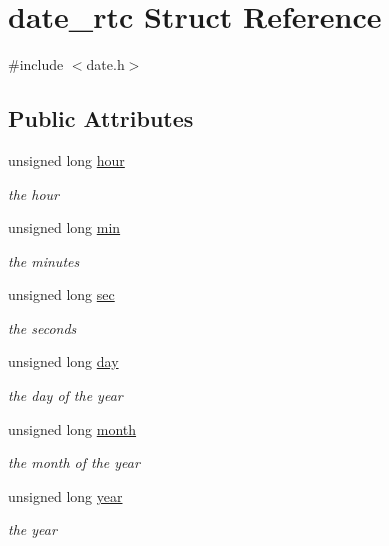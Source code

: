 \hypertarget{structdate__rtc}{}\section{date\+\_\+rtc Struct Reference}
\label{structdate__rtc}


{\ttfamily \#include $<$date.\+h$>$}

\subsection*{Public Attributes}
\begin{DoxyCompactItemize}
\item 
unsigned long \hyperlink{structdate__rtc_a4a231dccac478c1e2eb419ee34535e0e}{hour}
\begin{DoxyCompactList}\small\item\em the hour \end{DoxyCompactList}\item 
unsigned long \hyperlink{structdate__rtc_a6ea5d53162f2139e1e2a8d59bd3083b9}{min}
\begin{DoxyCompactList}\small\item\em the minutes \end{DoxyCompactList}\item 
unsigned long \hyperlink{structdate__rtc_a4d0f917003e201fbfe662d4c91907645}{sec}
\begin{DoxyCompactList}\small\item\em the seconds \end{DoxyCompactList}\item 
unsigned long \hyperlink{structdate__rtc_aafb65ff718f63c0e56aff1168ab3c154}{day}
\begin{DoxyCompactList}\small\item\em the day of the year \end{DoxyCompactList}\item 
unsigned long \hyperlink{structdate__rtc_a12309edd1455518380682d3241cd4b75}{month}
\begin{DoxyCompactList}\small\item\em the month of the year \end{DoxyCompactList}\item 
unsigned long \hyperlink{structdate__rtc_abf8b053026cf0db4cc2d260ce9cce925}{year}
\begin{DoxyCompactList}\small\item\em the year \end{DoxyCompactList}\end{DoxyCompactItemize}


